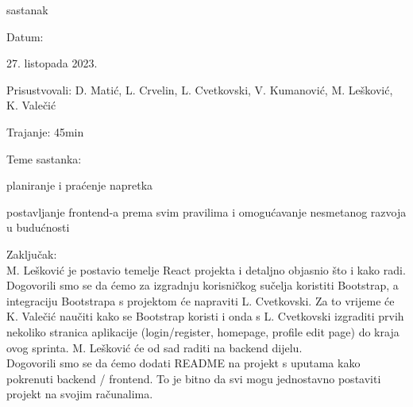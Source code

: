 \begin{packed_enum}
\begin{packed_item}
			\end{packed_item}

               \item  sastanak
			\item[] \begin{packed_item}
				\item Datum: \date[{27. listopada 2023.}
				\item Prisustvovali:  D. Matić, L. Crvelin, L. Cvetkovski, V. Kumanović, M. Lešković, K. Valečić
				\item Trajanje: 45min
				\item Teme sastanka:
				\begin{packed_item}
					\item  planiranje i praćenje napretka
					\item  postavljanje frontend-a prema svim pravilima i omogućavanje nesmetanog razvoja u budućnosti
				\end{packed_item}
            \item Zaključak: \\
            M. Lešković je postavio temelje React projekta i detaljno objasnio što i kako radi. Dogovorili smo se da ćemo za izgradnju korisničkog sučelja koristiti Bootstrap, a integraciju Bootstrapa s projektom će napraviti L. Cvetkovski. Za to vrijeme će K. Valečić naučiti kako se Bootstrap koristi i onda s L. Cvetkovski izgraditi prvih nekoliko stranica aplikacije (login/register, homepage, profile edit page) do kraja ovog sprinta. M. Lešković će od sad raditi na backend dijelu. \\
            Dogovorili smo se da ćemo dodati README na projekt s uputama kako pokrenuti backend / frontend. To je bitno da svi mogu jednostavno postaviti projekt na svojim računalima.
			\end{packed_item}


\end{packed_enum}
